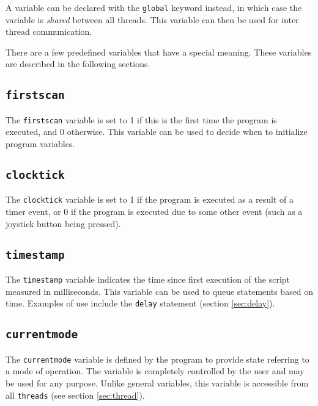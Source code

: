 \documentclass{article}
\begin{document}
A variable can be declared with the {\tt global} keyword instead, in 
which case the variable is {\it shared} between all threads. This 
variable can then be used for inter thread communication.

There are a few predefined variables that have a special meaning. These
variables are described in the following sections.

\subsection{{\tt firstscan}}
The {\tt firstscan} variable is set to 1 if this is the
first time the program is executed, and 0 otherwise. This
variable can be used to decide when to initialize program
variables.

\subsection{{\tt clocktick}}
The {\tt clocktick} variable is set to 1 if the program
is executed as a result of a timer event, or 0 if the
program is executed due to some other event (such as
a joystick button being pressed).

\subsection{{\tt timestamp}}
\label{sec:timestamp}
The {\tt timestamp} variable indicates the time since first
execution of the script measured in milliseconds. This variable can be used to
queue statements based on time. Examples of use include
the {\tt delay} statement (section \ref{sec:delay}).

\subsection{{\tt currentmode}}
The {\tt currentmode} variable is defined by the
program to provide state referring to a mode of
operation. The variable is completely controlled
by the user and may be used for any purpose.
Unlike general variables, this variable is
accessible from all {\tt threads} (see section \ref{sec:thread}).
\end{document}
